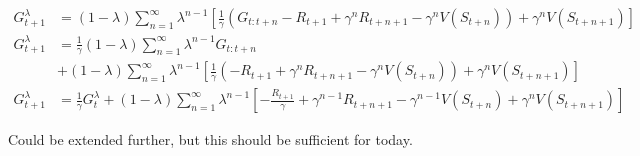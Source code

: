 \documentclass{article}
\begin{document}
\begin{align*}
    G_{t+1}^{\lambda} &= (1-\lambda)\sum_{n=1}^{\infty}\lambda^{n-1} \left[ \frac{1}{\gamma}\left(G_{t:t+n} - R_{t+1} + \gamma^{n} R_{t+n+1} -\gamma^n V(S_{t+n})\right) + \gamma^{n}V(S_{t+n+1}) \right] \\
    G_{t+1}^{\lambda} &= \frac{1}{\gamma}(1-\lambda)\sum_{n=1}^{\infty}\lambda^{n-1}G_{t:t+n}
    \\ &+ (1-\lambda)\sum_{n=1}^{\infty}\lambda^{n-1} \left[ \frac{1}{\gamma}\left(- R_{t+1} + \gamma^{n} R_{t+n+1} -\gamma^n V(S_{t+n})\right) + \gamma^{n}V(S_{t+n+1}) \right] \\
    G_{t+1}^{\lambda} &= \frac{1}{\gamma} G_t^{\lambda}+ (1-\lambda)\sum_{n=1}^{\infty}\lambda^{n-1} \left[ -\frac{R_{t+1}}{\gamma} + \gamma^{n-1} R_{t+n+1} -\gamma^{n-1} V(S_{t+n}) + \gamma^{n}V(S_{t+n+1}) \right]
\end{align*}

Could be extended further, but this should be sufficient for today.

\end{document}
